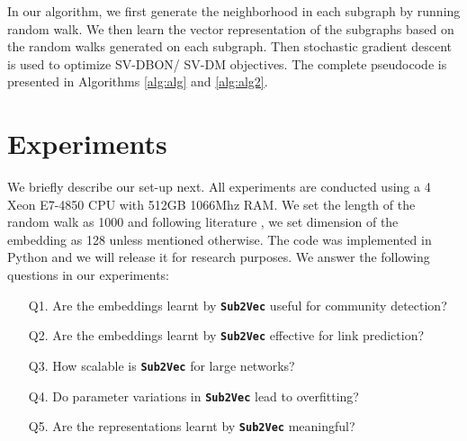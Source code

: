 \documentclass[sigconf]{acmart}
\newcommand{\alg}{{\bf {\tt Sub2Vec}}\xspace}
\begin{document}
In our algorithm, we first generate the neighborhood in each subgraph by running random walk. We then
learn the vector representation of the subgraphs based on the random walks generated on each subgraph. Then stochastic gradient descent is used to optimize SV-DBON/ SV-DM objectives. The complete pseudocode is presented in Algorithms  \ref{alg:alg} and \ref{alg:alg2}.


\section{Experiments}
\label{sec:experiments}
We briefly describe our set-up next. All experiments are conducted  using
a 4 Xeon E7-4850 CPU with 512GB 1066Mhz RAM. We set the length of the random walk as 1000 and following literature \cite{grover2016node2vec}, we set dimension of the embedding as 128 unless mentioned otherwise. The code was implemented in Python and we will release it for research purposes. 
We answer the following questions in our experiments: 
\begin{enumerate}[wide, labelwidth=!, labelindent=0pt, itemsep=0pt,nolistsep]
\item[Q1.] Are the embeddings learnt by \alg useful for community detection? 
\item[Q2.] Are the embeddings learnt by \alg effective for link prediction?
\item[Q3.] How scalable is \alg for large networks? 
\item[Q4.] Do parameter variations in \alg lead to overfitting? 
\item[Q5.] Are the representations learnt by \alg  meaningful?
\end{enumerate}
\end{document}
